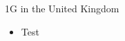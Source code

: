 \begin{frame}{1G in the United Kingdom}
  \begin{itemize}  
    \item Test\cite{Gess2002}
  \end{itemize}
\end{frame}
